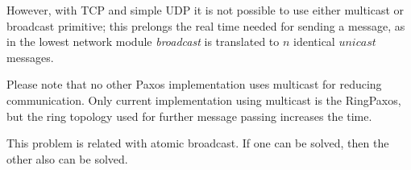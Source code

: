 However, with TCP and simple UDP it is not possible to use either multicast or broadcast primitive; this prelongs the real time needed for sending a message, as in the lowest network module \emph{broadcast} is translated to $n$ identical $unicast$ messages.

Please note that no other Paxos implementation uses multicast for reducing communication. Only current implementation using multicast is the RingPaxos\cite{Mar10}, but the ring topology used for further message passing increases the time.


\begin{TODO}
 This problem is related with atomic broadcast. If one can be solved, then the other also can be solved.
\end{TODO}


